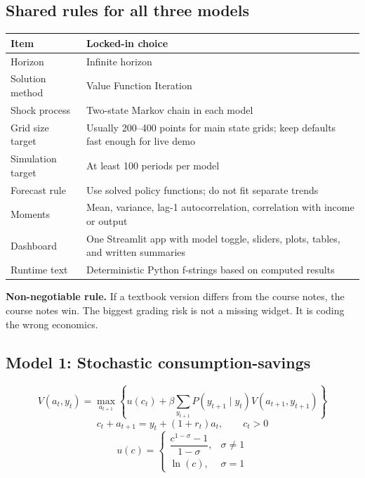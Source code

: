 \documentclass[11pt]{article}
\begin{document}
\subsection{Shared rules for all three models}
\begin{tabularx}{\linewidth}{@{}p{3.1cm}X@{}}
\toprule
\textbf{Item} & \textbf{Locked-in choice} \\
\midrule
Horizon & Infinite horizon \\
Solution method & Value Function Iteration \\
Shock process & Two-state Markov chain in each model \\
Grid size target & Usually 200--400 points for main state grids; keep defaults fast enough for live demo \\
Simulation target & At least 100 periods per model \\
Forecast rule & Use solved policy functions; do not fit separate trends \\
Moments & Mean, variance, lag-1 autocorrelation, correlation with income or output \\
Dashboard & One Streamlit app with model toggle, sliders, plots, tables, and written summaries \\
Runtime text & Deterministic Python f-strings based on computed results \\
\bottomrule
\end{tabularx}

\begin{warningbox}
\textbf{Non-negotiable rule.} If a textbook version differs from the course notes, the course notes win. The biggest grading risk is not a missing widget. It is coding the wrong economics.
\end{warningbox}

\subsection{Model 1: Stochastic consumption-savings}
\[
V(a_t,y_t) = \max_{a_{t+1}} \left\{ u(c_t) + \beta \sum_{y_{t+1}} P(y_{t+1}\mid y_t)V(a_{t+1},y_{t+1}) \right\}
\]
\[
c_t + a_{t+1} = y_t + (1+r_t)a_t, \qquad c_t > 0
\]
\[
u(c) =
\begin{cases}
\dfrac{c^{1-\sigma}-1}{1-\sigma}, & \sigma \neq 1 \\[0.4em]
\ln(c), & \sigma = 1
\end{cases}
\]
\end{document}
